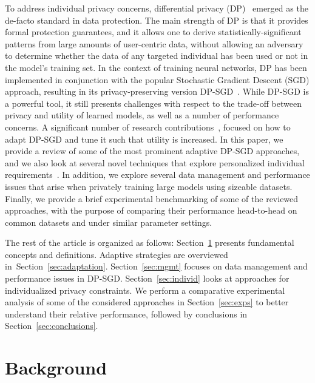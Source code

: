 \documentclass[11pt]{article}
\begin{document}
To address individual privacy concerns, differential privacy (DP)~\cite{dworkDP} emerged as the de-facto standard in data protection. The main strength of DP is that it provides formal protection guarantees, and it allows one to derive statistically-significant patterns from large amounts of user-centric data, without allowing an adversary to determine whether the data of any targeted individual has been used or not in the model's training set. In the context of training neural networks, DP has been implemented in conjunction with the popular Stochastic Gradient Descent (SGD) approach, resulting in its privacy-preserving version DP-SGD~\cite{RefWorks:RefID:40-abadi2016deep}. While DP-SGD is a powerful tool, it still presents challenges with respect to the trade-off between privacy and utility of learned models, as well as a number of performance concerns. A significant number of research contributions~\cite{RefWorks:RefID:37-andrewdifferentially,chen2020stochastic,RefWorks:RefID:35-pichapati2019adaclip:,RefWorks:RefID:39-he2022exploring,RefWorks:RefID:38-koskelalearning}, focused on how to adapt DP-SGD and tune it such that utility is increased. In this paper, we provide a review of some of the most prominent adaptive DP-SGD approaches, and we also look at several novel techniques that explore personalized individual requirements~\cite{pate,haveit}. In addition, we explore several data management and performance issues that arise when privately training large models using sizeable datasets. Finally, we provide a brief experimental benchmarking of some of the reviewed approaches, with the purpose of comparing their performance head-to-head on common datasets and under similar parameter settings.

The rest of the article is organized as follows: Section~\ref{bckg} presents fundamental concepts and definitions. Adaptive strategies are overviewed in~Section~\ref{sec:adaptation}. Section~\ref{sec:mgmt} focuses on data management and performance issues in DP-SGD. 
Section~\ref{sec:individ} looks at approaches for individualized privacy constraints. We perform a comparative experimental analysis of some of the considered approaches in Section~\ref{sec:exps} to better understand their relative performance, followed by conclusions in Section~\ref{sec:conclusions}.

\section{Background}
\label{bckg}
\end{document}
